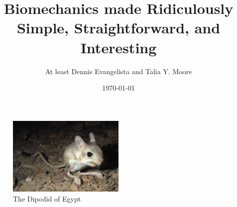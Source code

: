 \documentclass{book}
\title{Biomechanics made Ridiculously Simple, Straightforward, and Interesting}
\author{At least Dennis Evangelista and Talia Y. Moore}
\date{\today}
\begin{document}
\maketitle



\begin{figure}[h!]
 \label{jaculus}
 \centering
  \includegraphics[width=0.5\textwidth]{jaculus.jpg}
 \caption{The Dipodid  of Egypt}
\end{figure}
\end{document}
